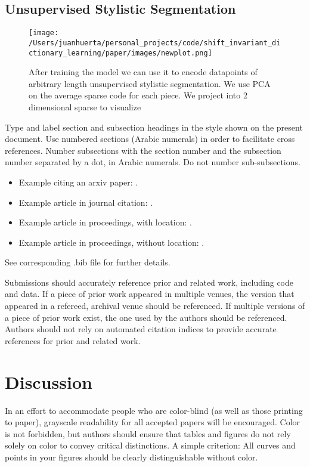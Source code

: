 \documentclass[11pt,a4paper]{article}
\begin{document}
\subsection{Unsupervised Stylistic Segmentation }

\begin{figure*}[ht]
  \texttt{[image: /Users/juanhuerta/personal\_projects/code/shift\_invariant\_dictionary\_learning/paper/images/newplot.png]}
  \caption{After training the model we can use it to encode datapoints of arbitrary length unsupervised stylistic segmentation. We use PCA on the average sparse code for each piece. We project into 2 dimensional sparse to visualize }
  \label{fig:boat1}
\end{figure*}

Type and label section and subsection headings in the
style shown on the present document.  Use numbered sections (Arabic
numerals) in order to facilitate cross references. Number subsections
with the section number and the subsection number separated by a dot,
in Arabic numerals.
Do not number sub-subsections.


\begin{itemize}
\item Example citing an arxiv paper: \cite{rasooli-tetrault-2015}. 
\item Example article in journal citation: \cite{Ando2005}.
\item Example article in proceedings, with location: \cite{borsch2011}.
\item Example article in proceedings, without location: \cite{andrew2007scalable}.
\end{itemize}
See corresponding .bib file for further details.

Submissions should accurately reference prior and related work, including code and data. If a piece of prior work appeared in multiple venues, the version that appeared in a refereed, archival venue should be referenced. If multiple versions of a piece of prior work exist, the one used by the authors should be referenced. Authors should not rely on automated citation indices to provide accurate references for prior and related work.


\section{Discussion}
\label{ssec:discussion}

In an effort to accommodate people who are color-blind (as well as those printing
to paper), grayscale readability for all accepted papers will be
encouraged.  Color is not forbidden, but authors should ensure that
tables and figures do not rely solely on color to convey critical
distinctions. A simple criterion: All curves and points in your figures should be clearly distinguishable without color.
\end{document}
